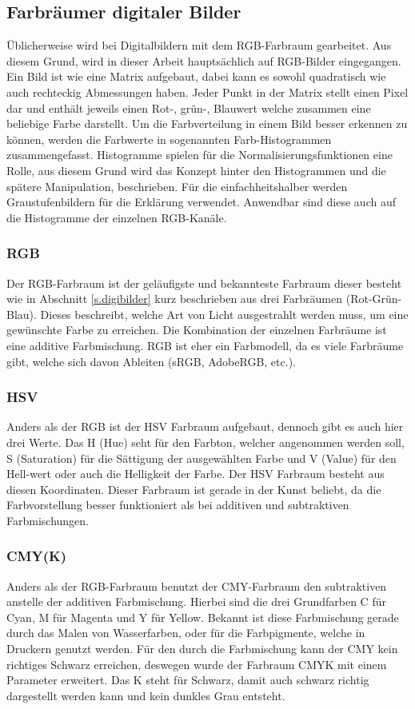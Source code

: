 \documentclass[a4paper,12pt,oneside]{article}
\begin{document}
\subsection{Farbräumer digitaler Bilder}\label{s.aufbdigibilder}
Üblicherweise wird bei Digitalbildern mit dem RGB-Farbraum gearbeitet. Aus diesem Grund, wird in dieser Arbeit hauptsächlich auf RGB-Bilder eingegangen. Ein Bild ist wie eine Matrix aufgebaut, dabei kann es sowohl quadratisch wie auch rechteckig Abmessungen haben. Jeder Punkt in der Matrix stellt einen Pixel dar und enthält jeweils einen Rot-, grün-, Blauwert welche zusammen eine beliebige Farbe darstellt. Um die Farbverteilung in einem Bild besser erkennen zu können, werden die Farbwerte in sogenannten Farb-Histogrammen zusammengefasst. Histogramme spielen für die Normalisierungsfunktionen eine Rolle, aus diesem Grund wird das Konzept hinter den Histogrammen und die spätere Manipulation, beschrieben. Für die einfachheitshalber werden Graustufenbildern für die Erklärung verwendet. Anwendbar sind diese auch auf die Histogramme der einzelnen RGB-Kanäle.
 \subsubsection{RGB}\label{s.rgb}
Der RGB-Farbraum ist der geläufigste und bekannteste Farbraum dieser besteht wie in Abschnitt \ref{s.digibilder} kurz beschrieben aus drei Farbräumen (Rot-Grün-Blau). Dieses beschreibt, welche Art von Licht ausgestrahlt werden muss, um eine gewünschte Farbe zu erreichen. Die Kombination der einzelnen Farbräume ist eine additive Farbmischung. RGB ist eher ein Farbmodell, da es viele Farbräume gibt, welche sich davon Ableiten (sRGB, AdobeRGB, etc.).
  \subsubsection{HSV}\label{s.hsv}
Anders als der RGB ist der HSV Farbraum aufgebaut, dennoch gibt es auch hier drei Werte. Das H (Hue) seht für den Farbton, welcher angenommen werden soll, S (Saturation) für die Sättigung der ausgewählten Farbe und V (Value) für den Hell-wert oder auch die Helligkeit der Farbe. Der HSV Farbraum besteht aus diesen Koordinaten. Dieser Farbraum ist gerade in der Kunst beliebt, da die Farbvorstellung besser funktioniert als bei additiven und subtraktiven Farbmischungen.
  \subsubsection{CMY(K)}\label{s.cmy}
Anders als der RGB-Farbraum benutzt der CMY-Farbraum den subtraktiven anstelle der additiven Farbmischung. Hierbei sind die drei Grundfarben C für Cyan, M für Magenta und Y für Yellow. Bekannt ist diese Farbmischung gerade durch das Malen von Wasserfarben, oder für die Farbpigmente, welche in Druckern genutzt werden. Für den durch die Farbmischung kann der CMY kein richtiges Schwarz erreichen, deswegen wurde der Farbraum CMYK mit einem Parameter erweitert. Das K steht für Schwarz, damit auch schwarz richtig dargestellt werden kann und kein dunkles Grau entsteht.
\end{document}
